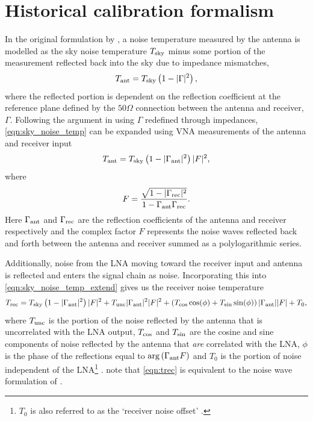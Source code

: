 \section{Historical calibration formalism}\label{sec:historic_cal}
In the original formulation by \citet{rogersCal}, a noise temperature measured by the antenna is modelled as the sky noise temperature $T_{\mathrm{sky}}$ minus some portion of the measurement reflected back into the sky due to impedance mismatches,
\begin{equation}
    T_{\mathrm{ant}} = T_{\mathrm{sky}} \left( 1 - |\Gamma|^2 \right),
    \label{eqn:sky_noise_temp}
\end{equation}
where the reflected portion is dependent on the reflection coefficient at the reference plane defined by the $50\Omega$ connection between the antenna and receiver, $\Gamma$. Following the argument in \citep{rogersCal} using $\Gamma$ redefined through impedances, \cref{eqn:sky_noise_temp} can be expanded using VNA measurements of the antenna and receiver input
\begin{equation}
    T_{\mathrm{ant}} = T_{\mathrm{sky}} \left( 1 - |\Gamma_{\mathrm{ant}}|^2 \right) |F|^2,
    \label{eqn:sky_noise_temp_extend}
\end{equation}
where
\begin{equation}
    F = \frac{\sqrt{1-|\Gamma_{\mathrm{rec}}|^2}}{1-\Gamma_{\mathrm{ant}}\Gamma_{\mathrm{rec}}}.
    \label{eqn:f}
\end{equation}
Here $\Gamma_{\mathrm{ant}}$ and $\Gamma_{\mathrm{rec}}$ are the reflection coefficients of the antenna and receiver respectively and the complex factor $F$ represents the noise waves reflected back and forth between the antenna and receiver summed as a polylogarithmic series.

Additionally, noise from the LNA moving toward the receiver input and antenna is reflected and enters the signal chain as noise. Incorporating this into \cref{eqn:sky_noise_temp_extend} gives us the receiver noise temperature
\begin{equation}
    T_{\mathrm{rec}} = T_{\mathrm{sky}} \left( 1 - |\Gamma_{\mathrm{ant}}|^2 \right) |F|^2 + T_{\mathrm{unc}}|\Gamma_{\mathrm{ant}}|^2|F|^2 + \left( T_{\mathrm{cos}}\cos(\phi) + T_{\mathrm{sin}}\sin(\phi) \right) |\Gamma_{\mathrm{ant}}||F| + T_0,
    \label{eqn:trec}
\end{equation}
where $T_{\mathrm{unc}}$ is the portion of the noise reflected by the antenna that is uncorrelated with the LNA output, $T_{\mathrm{cos}}$ and $T_{\mathrm{sin}}$ are the cosine and sine components of noise reflected by the antenna that \textit{are} correlated with the LNA, $\phi$ is the phase of the reflections equal to $\mathrm{arg}\left(\Gamma_{\mathrm{ant}}F\right)$ and $T_0$ is the portion of noise independent of the LNA\footnote{$T_0$ is also referred to as the ‘receiver noise offset’ \citep{edgesCal}.} \citep{rogersCal}. \citet{rogersCal} note that \cref{eqn:trec} is equivalent to the noise wave formulation of \citet{meys}.


